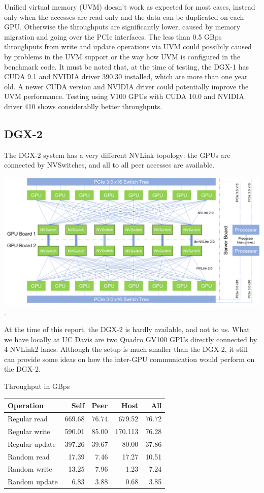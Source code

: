 \documentclass[10pt,oneside]{memoir}
\begin{document}
Unified virtual memory (UVM) doesn't work as expected for most cases,
instead only when the accesses are read only and the data can be
duplicated on each GPU. Otherwise the throughputs are significantly
lower, caused by memory migration and going over the PCIe interfaces.
The less than 0.5 GBps throughputs from write and update operations via
UVM could possibily caused by problems in the UVM support or the way how
UVM is configured in the benchmark code. It must be noted that, at the
time of testing, the DGX-1 has CUDA 9.1 and NVIDIA driver 390.30
installed, which are more than one year old. A newer CUDA version and
NVIDIA driver could potentially improve the UVM performance. Testing
using V100 GPUs with CUDA 10.0 and NVIDIA driver 410 shows considerablly
better throughputs.

\hypertarget{dgx-2}{%
\subsection{DGX-2}\label{dgx-2}}

The DGX-2 system has a very different NVLink topology: the GPUs are
connected by NVSwitches, and all to all peer accesses are available.

\includegraphics{attachments/scaling/NVLink-DGX2.png}.

At the time of this report, the DGX-2 is hardly available, and not to
us. What we have locally at UC Davis are two Quadro GV100 GPUs directly
connected by 4 NVLink2 lanes. Although the setup is much smaller than
the DGX-2, it still can provide some ideas on how the inter-GPU
communication would perform on the DGX-2.

Throughput in GBps

\begin{longtable}[]{@{}lrrrr@{}}
\toprule
Operation & Self & Peer & Host & All\tabularnewline
\midrule
\endhead
Regular read & 669.68 & 76.74 & 679.52 & 76.72\tabularnewline
Regular write & 590.01 & 85.00 & 170.113 & 76.28\tabularnewline
Regular update & 397.26 & 39.67 & 80.00 & 37.86\tabularnewline
Random read & 17.39 & 7.46 & 17.27 & 10.51\tabularnewline
Random write & 13.25 & 7.96 & 1.23 & 7.24\tabularnewline
Random update & 6.83 & 3.88 & 0.68 & 3.85\tabularnewline
\bottomrule
\end{longtable}
\end{document}
